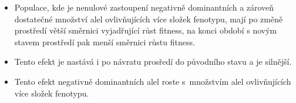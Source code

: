 \begin{enumerate}
{        \begin{itemize}
        \item{Populace, kde je nenulové zastoupení negativně dominantních a zároveň dostatečné množství alel ovlivňujících
              více složek fenotypu, mají po změně prostředí větší směrnici vyjadřující růst fitness,
              na konci období s novým stavem prostředí pak menší směrnici růstu fitness.}
        \item{Tento efekt je nastává i po návratu prosředí do původního stavu a je silnější.}
        \item{Tento efekt negativně dominantních alel roste s množstvím alel ovlivňujících více složek fenotypu.}
        \end{itemize}
    }
\end{enumerate}
